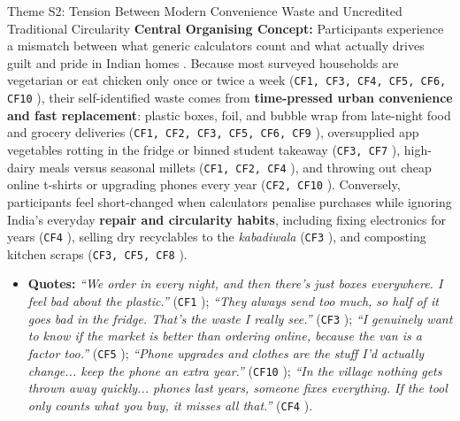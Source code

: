 \documentclass[12pt, a4paper]{article}
\begin{document}
\begin{semanticcard}{Theme S2: Tension Between Modern Convenience Waste and Uncredited Traditional Circularity}
\textbf{Central Organising Concept:} Participants experience a mismatch between what generic calculators count and what actually drives guilt and pride in Indian homes \cite{lee2021}. Because most surveyed households are vegetarian or eat chicken only once or twice a week (\texttt{CF1, CF3, CF4, CF5, CF6, CF10} \cite{cf1, cf3, cf4, cf5, cf6, cf10}), their self-identified waste comes from \textbf{time-pressed urban convenience and fast replacement}: plastic boxes, foil, and bubble wrap from late-night food and grocery deliveries (\texttt{CF1, CF2, CF3, CF5, CF6, CF9} \cite{liu2020, cf1, cf2, cf3, cf5, cf6, cf9}), oversupplied app vegetables rotting in the fridge or binned student takeaway (\texttt{CF3, CF7} \cite{cf3, cf7}), high-dairy meals versus seasonal millets (\texttt{CF1, CF2, CF4} \cite{cf1, cf2, cf4}), and throwing out cheap online t-shirts or upgrading phones every year (\texttt{CF2, CF10} \cite{shi2021, cf2, cf10}). Conversely, participants feel short-changed when calculators penalise purchases while ignoring India's everyday \textbf{repair and circularity habits}, including fixing electronics for years (\texttt{CF4} \cite{cf4}), selling dry recyclables to the \textit{kabadiwala} (\texttt{CF3} \cite{cf3}), and composting kitchen scraps (\texttt{CF3, CF5, CF8} \cite{cf3, cf5, cf8}).
\begin{itemize}
    \item \textbf{Quotes:} \textit{``We order in every night, and then there's just boxes everywhere. I feel bad about the plastic.''} (\texttt{CF1} \cite{cf1}); \textit{``They always send too much, so half of it goes bad in the fridge. That's the waste I really see.''} (\texttt{CF3} \cite{cf3}); \textit{``I genuinely want to know if the market is better than ordering online, because the van is a factor too.''} (\texttt{CF5} \cite{cf5}); \textit{``Phone upgrades and clothes are the stuff I'd actually change... keep the phone an extra year.''} (\texttt{CF10} \cite{cf10}); \textit{``In the village nothing gets thrown away quickly... phones last years, someone fixes everything. If the tool only counts what you buy, it misses all that.''} (\texttt{CF4} \cite{cf4}).
\end{itemize}
\end{semanticcard}
\end{document}
